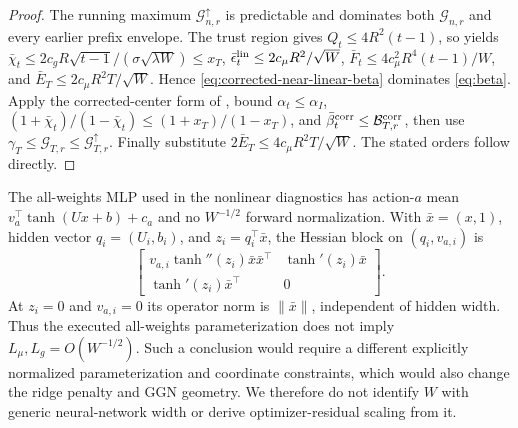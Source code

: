 \begin{proof}
The running maximum $\mathcal G^\uparrow_{n,r}$ is predictable and dominates
both $\mathcal G_{n,r}$ and every earlier prefix envelope.
The trust region gives $Q_t\le4R^2(t-1)$, so
 yields
$\bar\chi_t\le2c_gR\sqrt{t-1}/(\sigma\sqrt{\lambda W})\le x_T$,
$\bar\epsilon_t^{\rm lin}\le2c_\mu R^2/\sqrt W$,
$\bar F_t\le4c_\mu^2R^4(t-1)/W$, and
$\bar E_T\le2c_\mu R^2T/\sqrt W$.  Hence
\eqref{eq:corrected-near-linear-beta} dominates \eqref{eq:beta}.
Apply the corrected-center form of
, bound
$\alpha_t\le\alpha_I$, $(1+\bar\chi_t)/(1-\bar\chi_t)\le
(1+x_T)/(1-x_T)$, and
$\bar\beta_t^{\rm corr}\le\mathcal B_{T,r}^{\rm corr}$, then use
$\gamma_T\le\mathcal G_{T,r}\le\mathcal G^\uparrow_{T,r}$.  Finally substitute
$2\bar E_T\le4c_\mu R^2T/\sqrt W$.  The stated orders follow directly.
\end{proof}

\begin{remark}
The all-weights MLP used in the nonlinear diagnostics has action-$a$ mean
$v_a^\top\tanh(Ux+b)+c_a$ and no $W^{-1/2}$ forward normalization.  With
$\bar x=(x,1)$, hidden vector $q_i=(U_i,b_i)$, and $z_i=q_i^\top\bar x$, the
Hessian block on $(q_i,v_{a,i})$ is
\[
 \begin{bmatrix}
  v_{a,i}\tanh''(z_i)\bar x\bar x^\top&
  \tanh'(z_i)\bar x\\
  \tanh'(z_i)\bar x^\top&0
 \end{bmatrix}.
\]
At $z_i=0$ and $v_{a,i}=0$ its operator norm is $\|\bar x\|$, independent of
hidden width.  Thus the executed all-weights parameterization does not imply
$L_\mu,L_g=O(W^{-1/2})$.  Such a conclusion would require a different
explicitly normalized parameterization and coordinate constraints, which
would also change the ridge penalty and GGN geometry.  We therefore do not
identify $W$ with generic neural-network width or derive optimizer-residual
scaling from it.
\end{remark}

